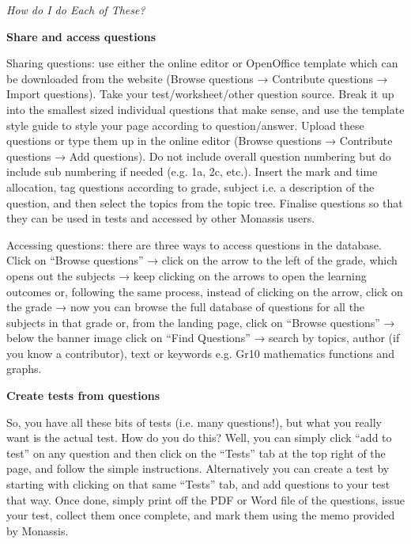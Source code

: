 {{\normalfont\sffamily\fontsize{16}\normalfont\itshape  How do I do Each of These?}\par 
\textbf{Share and access questions}\par 
Sharing questions: use either the online editor or OpenOffice template which can be downloaded from the website (Browse questions → Contribute questions → Import questions). Take your test/worksheet/other question source. Break it up into the smallest sized individual questions that make sense, and use the template style guide to style your page according to question/answer. Upload these questions or type them up in the online editor (Browse questions → Contribute questions → Add questions). Do not include overall question numbering but do include sub numbering if needed (e.g. 1a, 2c, etc.). Insert the mark and time allocation, tag questions according to grade, subject i.e. a description of the question, and then select the topics from the topic tree. Finalise questions so that they can be used in tests and accessed by other Monassis users.\par 

Accessing questions: there are three ways to access questions in the database. Click on “Browse questions” → click on the arrow to the left of the grade, which opens out the subjects → keep clicking on the arrows to open the learning outcomes or, following the same process, instead of clicking on the arrow, click on the grade → now you can browse the full database of questions for all the subjects in that grade or, from the landing page, click on “Browse questions” → below the banner image click on “Find Questions” → search by topics, author (if you know a contributor), text or keywords e.g. Gr10 mathematics functions and graphs. \par 

\textbf{Create tests from questions
}\par 
So, you have all these bits of tests (i.e. many questions!), but what you really want is the actual test. How do you do this? Well, you can simply click “add to test” on any question and then click on the “Tests” tab at the top right of the page, and follow the simple instructions. Alternatively you can create a test by starting with clicking on that same “Tests” tab, and add questions to your test that way. Once done, simply print off the PDF or Word file of the questions, issue your test, collect them once complete, and mark them using the memo provided by Monassis. \par 

}
